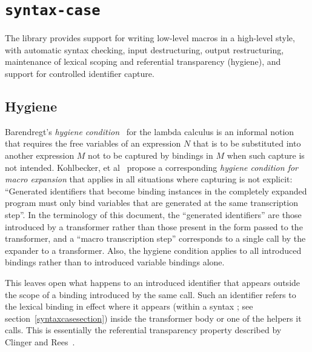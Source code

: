 \chapter{{\tt syntax-case}}
\label{syntaxcasechapter}


The  library
provides
support for writing low-level macros
in a high-level style, with automatic syntax checking, input
destructuring, output restructuring, maintenance of lexical scoping
and referential transparency (hygiene), and support for controlled
identifier capture.

\section{Hygiene}
\label{hygienesection}


Barendregt's \emph{hygiene condition}~\cite{barendregt} for the
lambda calculus is an informal notion that requires the free variables of
an expression $N$ that is to be substituted into another expression $M$ not to
be captured by bindings in $M$ when such capture is not intended.
Kohlbecker, et al~\cite{hygienic} propose a corresponding
\emph{hygiene condition for macro expansion} that applies in all situations
where capturing is not explicit:
``Generated identifiers that become binding instances in
the completely expanded program must only bind variables that
are generated at the same transcription step''.
In the terminology of this document, the ``generated identifiers'' are
those introduced by a transformer rather than those present in the form
passed to the transformer, and a ``macro transcription step'' corresponds
to a single call by the expander to a transformer.
Also, the hygiene condition applies to all introduced bindings rather than
to introduced variable bindings alone.

This leaves open what happens to an introduced identifier that appears
outside the scope of a binding introduced by the same call.
Such an identifier refers to the lexical binding in effect where it
appears (within a {\cf syntax} ;
see section~\ref{syntaxcasesection}) inside the transformer body or one of
the helpers it calls.
This is essentially the referential transparency property described
by Clinger and Rees~\cite{macrosthatwork}.

